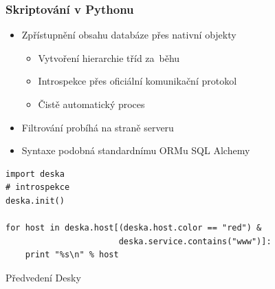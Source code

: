 \documentclass{beamer}
\begin{document}
\begin{frame}[fragile]
\frametitle{Skriptování v Pythonu}
\begin{itemize}
    \item Zpřístupnění obsahu databáze přes nativní objekty
        \begin{itemize}
            \item Vytvoření hierarchie tříd za~běhu
            \item Introspekce přes oficiální komunikační protokol
            \item Čistě automatický proces
        \end{itemize}
    \item Filtrování probíhá na straně serveru
    \item Syntaxe podobná standardnímu ORMu SQL Alchemy
\end{itemize}
\begin{verbatim}
import deska
# introspekce
deska.init()

for host in deska.host[(deska.host.color == "red") &
                       deska.service.contains("www")]:
    print "%s\n" % host
\end{verbatim}
\end{frame}


\begin{frame}[fragile]
\begin{center}
Předvedení Desky
\end{center}
\end{frame}
\end{document}
